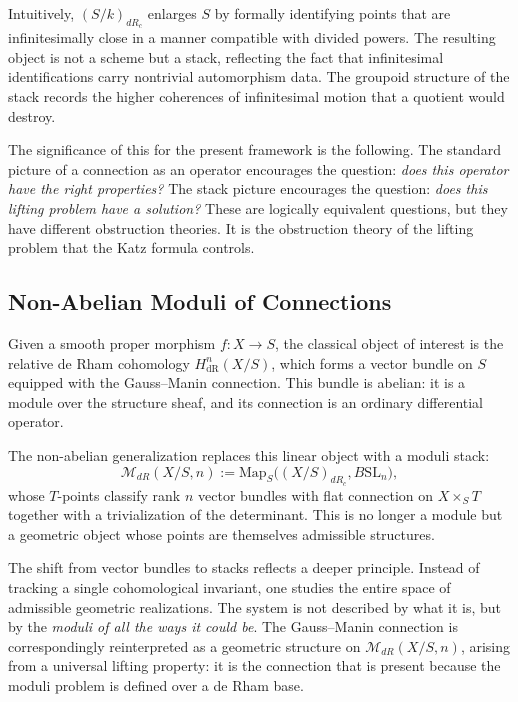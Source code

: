\documentclass[12pt]{article}
\begin{document}
Intuitively, $(S/k)_{dR_c}$ enlarges $S$ by formally identifying points that are
infinitesimally close in a manner compatible with divided powers. The resulting object
is not a scheme but a stack, reflecting the fact that infinitesimal identifications
carry nontrivial automorphism data. The groupoid structure of the stack records the
higher coherences of infinitesimal motion that a quotient would destroy.

The significance of this for the present framework is the following. The standard
picture of a connection as an operator encourages the question: \emph{does this
operator have the right properties?} The stack picture encourages the question:
\emph{does this lifting problem have a solution?} These are logically equivalent
questions, but they have different obstruction theories. It is the obstruction theory
of the lifting problem that the Katz formula controls.

\subsection{Non-Abelian Moduli of Connections}

Given a smooth proper morphism $f : X \to S$, the classical object of interest is
the relative de Rham cohomology $H^n_{\mathrm{dR}}(X/S)$, which forms a vector
bundle on $S$ equipped with the Gauss--Manin connection. This bundle is abelian: it
is a module over the structure sheaf, and its connection is an ordinary differential
operator.

The non-abelian generalization replaces this linear object with a moduli stack:
\[
\mathcal{M}_{dR}(X/S, n) := \mathrm{Map}_S\big((X/S)_{dR_c}, B\mathrm{SL}_n\big),
\]
whose $T$-points classify rank $n$ vector bundles with flat connection on
$X \times_S T$ together with a trivialization of the determinant. This is no longer a
module but a geometric object whose points are themselves admissible structures.

The shift from vector bundles to stacks reflects a deeper principle. Instead of
tracking a single cohomological invariant, one studies the entire space of admissible
geometric realizations. The system is not described by what it is, but by the
\emph{moduli of all the ways it could be}. The Gauss--Manin connection is
correspondingly reinterpreted as a geometric structure on $\mathcal{M}_{dR}(X/S,n)$,
arising from a universal lifting property: it is the connection that is present because
the moduli problem is defined over a de Rham base.
\end{document}
